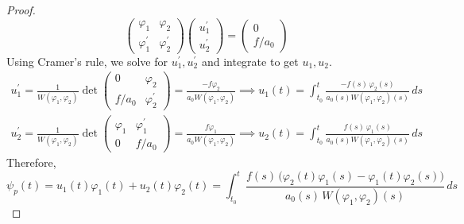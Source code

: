 \documentclass{article}
\theoremstyle{remark}
\theoremstyle{definition}
\begin{document}
\begin{proof}
      \[\begin{pmatrix}
      \varphi_1 & \varphi_2 \\
      \varphi_1^\prime & \varphi_2^\prime
      \end{pmatrix} \begin{pmatrix}
      u_1^\prime \\u_2^\prime
      \end{pmatrix} = \begin{pmatrix}
      0 \\ f / a_0
      \end{pmatrix}\]
      Using Cramer's rule, we solve for $u_1^\prime, u_2^\prime$ and integrate to get $u_1, u_2$. 
      \begin{align*}
          u_1^\prime = \frac{1}{W(\varphi_1, \varphi_2)} \det{\begin{pmatrix} 0 & \varphi_2 \\ f / a_0 & \varphi_2^\prime
          \end{pmatrix}} = \frac{-f \varphi_2}{a_0 W(\varphi_1, \varphi_2)} \implies u_1 (t) = \int_{t_0}^t \frac{-f(s)\,\varphi_2 (s)}{ a_0 (s) W(\varphi_1, \varphi_2) (s)}\,ds \\
          u_2^\prime = \frac{1}{W(\varphi_1, \varphi_2)} \det{\begin{pmatrix} \varphi_1 & \varphi_1^\prime \\ 0 & f / a_0
          \end{pmatrix}} = \frac{f \varphi_1}{a_0 W(\varphi_1, \varphi_2)} \implies u_2 (t) = \int_{t_0}^t \frac{f(s)\,\varphi_1 (s)}{ a_0 (s) W(\varphi_1, \varphi_2) (s)}\,ds
      \end{align*}
      Therefore, 
      \[\psi_p (t) = u_1 (t) \varphi_1 (t) + u_2 (t) \varphi_2 (t) = \int_{t_0}^t \frac{f(s) \, \big( \varphi_2 (t) \varphi_1 (s) - \varphi_1(t) \varphi_2 (s)\big)}{a_0 (s) \, W(\varphi_1, \varphi_2) (s)}\,ds\]
      \end{proof}
\end{document}
